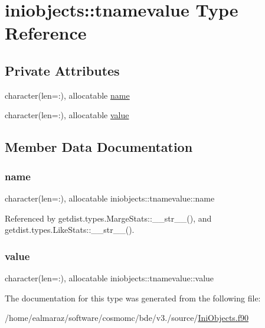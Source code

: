 \hypertarget{structiniobjects_1_1tnamevalue}{}\section{iniobjects\+:\+:tnamevalue Type Reference}
\label{structiniobjects_1_1tnamevalue}
\subsection*{Private Attributes}
\begin{DoxyCompactItemize}
\item 
character(len=\+:), allocatable \mbox{\hyperlink{structiniobjects_1_1tnamevalue_a53206be2652057a9e617821877202f8a}{name}}
\item 
character(len=\+:), allocatable \mbox{\hyperlink{structiniobjects_1_1tnamevalue_a32ce195ea38443557602dc399b645a4b}{value}}
\end{DoxyCompactItemize}


\subsection{Member Data Documentation}
\mbox{\label{structiniobjects_1_1tnamevalue_a53206be2652057a9e617821877202f8a}} 
\subsubsection{\texorpdfstring{name}{name}}
{\footnotesize\ttfamily character(len=\+:), allocatable iniobjects\+::tnamevalue\+::name\hspace{0.3cm}{\ttfamily [private]}}



Referenced by getdist.\+types.\+Marge\+Stats\+::\+\_\+\+\_\+str\+\_\+\+\_\+(), and getdist.\+types.\+Like\+Stats\+::\+\_\+\+\_\+str\+\_\+\+\_\+().

\mbox{\label{structiniobjects_1_1tnamevalue_a32ce195ea38443557602dc399b645a4b}} 
\subsubsection{\texorpdfstring{value}{value}}
{\footnotesize\ttfamily character(len=\+:), allocatable iniobjects\+::tnamevalue\+::value\hspace{0.3cm}{\ttfamily [private]}}



The documentation for this type was generated from the following file\+:\begin{DoxyCompactItemize}
\item 
/home/ealmaraz/software/cosmomc/bde/v3./source/\mbox{\hyperlink{IniObjects_8f90}{Ini\+Objects.\+f90}}\end{DoxyCompactItemize}
